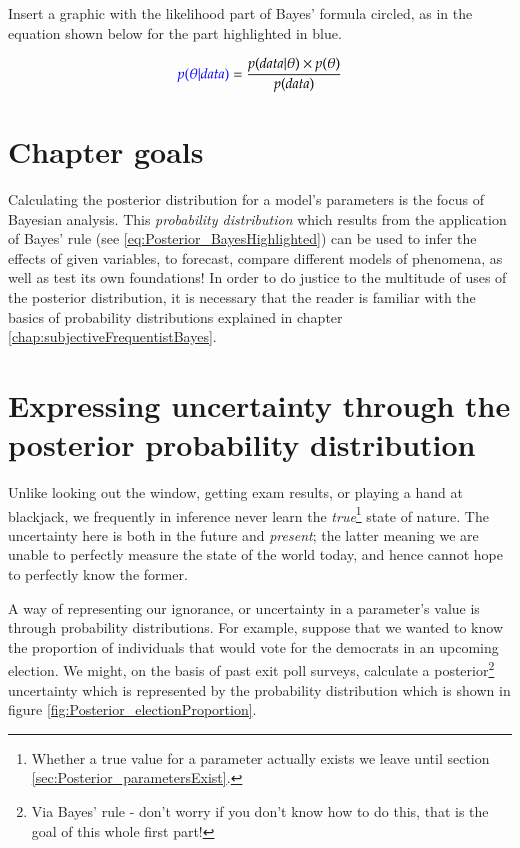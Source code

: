\documentclass[11pt,fullpage]{book}
\begin{document}
Insert a graphic with the likelihood part of Bayes' formula circled, as in the equation shown below for the part highlighted in blue.

\begin{equation}
{\color{blue}p(\theta|data)} = \frac{p(data|\theta)\times p(\theta)}{p(data)}
\end{equation}\label{eq:Posterior_BayesHighlighted}

\section{Chapter goals}
Calculating the posterior distribution for a model's parameters is the focus of Bayesian analysis. This \textit{probability distribution} which results from the application of Bayes' rule (see \ref{eq:Posterior_BayesHighlighted}) can be used to infer the effects of given variables, to forecast, compare different models of phenomena, as well as test its own foundations! In order to do justice to the multitude of uses of the posterior distribution, it is necessary that the reader is familiar with the basics of probability distributions explained in chapter \ref{chap:subjectiveFrequentistBayes}. 

\section{Expressing uncertainty through the posterior probability distribution}\label{sec:Posterior_parameterUncertainty}
Unlike looking out the window, getting exam results, or playing a hand at blackjack, we frequently in inference never learn the \textit{true}\footnote{Whether a true value for a parameter actually exists we leave until section \ref{sec:Posterior_parametersExist}.} state of nature. The uncertainty here is both in the future and \textit{present}; the latter meaning we are unable to perfectly measure the state of the world today, and hence cannot hope to perfectly know the former.

A way of representing our ignorance, or uncertainty in a parameter's value is through probability distributions. For example, suppose that we wanted to know the proportion of individuals that would vote for the democrats in an upcoming election. We might, on the basis of past exit poll surveys, calculate a posterior\footnote{Via Bayes' rule - don't worry if you don't know how to do this, that is the goal of this whole first part!} uncertainty which is represented by the probability distribution which is shown in figure \ref{fig:Posterior_electionProportion}. 
\end{document}

